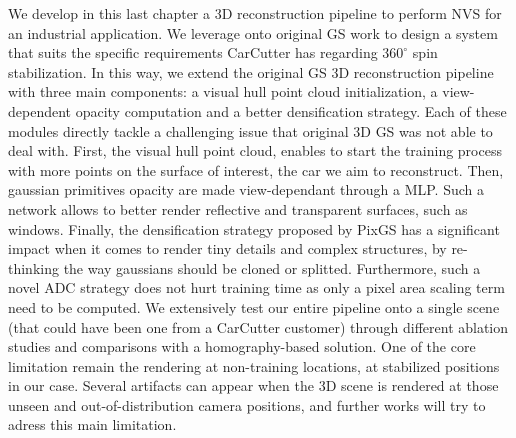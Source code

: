 We develop in this last chapter a 3D reconstruction pipeline to perform \ac{NVS} for an industrial application. We leverage onto original \ac{GS} \citep{kerbl20233d} work to design a system that suits the specific requirements CarCutter has regarding $360^{\circ}$ spin stabilization. In this way, we extend the original \ac{GS} 3D reconstruction pipeline with three main components: a visual hull point cloud initialization, a view-dependent opacity computation and a better densification strategy. Each of these modules directly tackle a challenging issue that original 3D \ac{GS} was not able to deal with. First, the visual hull point cloud, enables to start the training process with more points on the surface of interest, the car we aim to reconstruct. Then, gaussian primitives opacity are made view-dependant through a \ac{MLP}. Such a network allows to better render reflective and transparent surfaces, such as windows. Finally, the densification strategy proposed by PixGS \citep{zhang2024pixel} has a significant impact when it comes to render tiny details and complex structures, by re-thinking the way gaussians should be cloned or splitted. Furthermore, such a novel \ac{ADC} strategy does not hurt training time as only a pixel area scaling term need to be computed. We extensively test our entire pipeline onto a single scene (that could have been one from a CarCutter customer) through different ablation studies and comparisons with a homography-based solution. One of the core limitation remain the rendering at non-training locations, \ie at stabilized positions in our case. Several artifacts can appear when the 3D scene is rendered at those unseen and out-of-distribution camera positions, and further works will try to adress this main limitation. 



